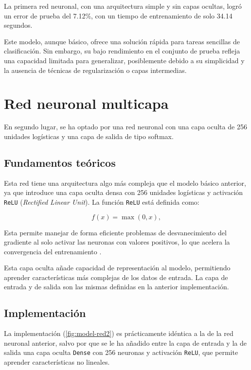 La primera red neuronal, con una arquitectura simple y sin capas ocultas, logró un error de prueba del 7.12\%, con un tiempo de entrenamiento de solo 34.14 segundos.

Este modelo, aunque básico, ofrece una solución rápida para tareas sencillas de clasificación. Sin embargo, su bajo rendimiento en el conjunto de prueba refleja una capacidad limitada para generalizar, posiblemente debido a su simplicidad y la ausencia de técnicas de regularización o capas intermedias.

\section{Red neuronal multicapa}

En segundo lugar, se ha optado por una red neuronal con una capa oculta de 256 unidades logísticas y una capa de salida de tipo softmax.

\subsection{Fundamentos teóricos}

Esta red tiene una arquitectura algo más compleja que el modelo básico anterior, ya que introduce una capa oculta densa con 256 unidades logísticas y activación \texttt{ReLU} (\textit{Rectified Linear Unit}). La función \texttt{ReLU} está definida como:

\[
f(x) = \max(0, x),
\]

Esta permite manejar de forma eficiente problemas de desvanecimiento del gradiente al solo activar las neuronas con valores positivos, lo que acelera la convergencia del entrenamiento \parencite{nair2010relu}.

Esta capa oculta añade capacidad de representación al modelo, permitiendo aprender características más complejas de los datos de entrada. La capa de entrada y de salida son las mismas definidas en la anterior implementación.


\subsection{Implementación}

La implementación (\autoref{fig:model-red2}) es prácticamente idéntica a la de la red neuronal anterior, salvo por que se le ha añadido entre la capa de entrada y la de salida una capa oculta \texttt{Dense} con 256 neuronas y activación \texttt{ReLU}, que permite aprender características no lineales.

